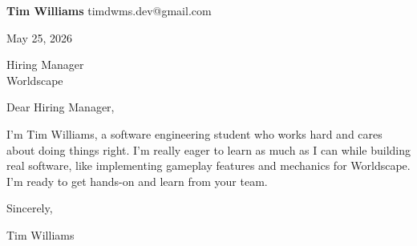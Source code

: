 \documentclass[12pt]{article}
\begin{document}
\textbf{Tim Williams} \hfill timdwms.dev@gmail.com

\vspace{1em}

May 25, 2026

\vspace{1em}

Hiring Manager \\
Worldscape

\vspace{1em}

Dear Hiring Manager,

I'm Tim Williams, a software engineering student who works hard and cares about doing things right. I'm really eager to learn as much as I can while building real software, like implementing gameplay features and mechanics for Worldscape. I'm ready to get hands-on and learn from your team.

\vspace{1em}

Sincerely,

\vspace{2em}

Tim Williams
\end{document}

